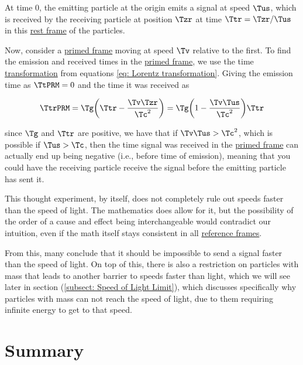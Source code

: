 At time $0$, the emitting particle at the origin emits a signal at speed $\Tus$, which is received by the receiving particle at position $\Tzr$ at time $\Ttr=\Tzr/\Tus$ in this \hyperlink{def-proper-frame}{rest frame} of the particles.

Now, consider a \hyperlink{def-Primed-Frame}{primed frame} moving at speed $\Tv$ relative to the first.
To find the emission and received times in the \hyperlink{def-Primed-Frame}{primed frame}, we use the time \hyperlink{def-transform}{transformation} from equations \eqref{eq: Lorentz transformation}.
Giving the emission time as $\TtPRM=0$ and the time it was received as

\begin{equation}
\TtrPRM= \Tg  \bigg( \Ttr -\frac{ {\Tv }{\Tzr } }{ \Tc ^2}\bigg) = \Tg  \bigg(1  -\frac{ {\Tv }{\Tus } }{ \Tc ^2}\bigg) \Ttr
\end{equation}

since $\Tg$ and $\Ttr$ are positive, we have that if ${\Tv }{\Tus }>\Tc^2$, which is possible if $\Tus>\Tc$, then the time signal was received in the \hyperlink{def-Primed-Frame}{primed frame} can actually end up being negative (i.e., before time of emission), meaning that you could have the receiving particle receive the signal before the emitting particle has sent it.

This thought experiment, by itself, does not completely rule out speeds faster than the speed of light.
The mathematics does allow for it, but the possibility of the order of a cause and effect being interchangeable would contradict our intuition, even if the math itself stays consistent in all \hyperlink{def-Reference-frame}{reference frames}.

From this, many conclude that it should be impossible to send a signal faster than the speed of light.
On top of this, there is also a restriction on particles with mass that leads to another barrier to speeds faster than light, which we will see later in section (\ref{subsect: Speed of Light Limit}), which discusses specifically why particles with mass can not reach the speed of light, due to them requiring infinite energy to get to that speed.

\section{Summary}\label{sect: Summary chapter 2}


